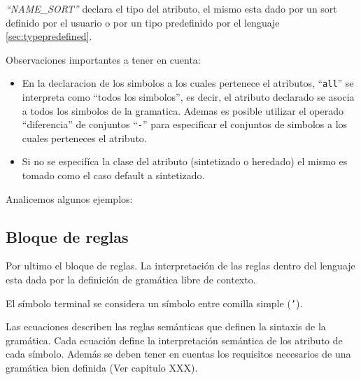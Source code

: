 \textit{``NAME\_SORT''} declara el tipo del atributo, el mismo esta dado por un sort definido por el usuario o por un tipo predefinido por el lenguaje \ref{sec:typepredefined}.


Observaciones importantes a tener en cuenta:
\begin{itemize}
\item En la declaracion de los simbolos a los cuales pertenece el atributos, ``\texttt{all}'' se interpreta como ``todos los simbolos'', es decir, el atributo declarado se asocia a todos los simbolos de la gramatica. Ademas es posible utilizar el operado ``diferencia'' de conjuntos ``\texttt{-}'' para especificar el conjuntos de simbolos a los cuales perteneces el atributo. 
\item Si no se especifíca la clase del atributo (sintetizado o heredado) el mismo es tomado como el caso default a sintetizado.
\end{itemize}

Analicemos algunos ejemplos:\\


\subsection{Bloque de reglas}
Por ultimo el bloque de reglas. La interpretación de las reglas dentro del lenguaje esta dada por la definición de gramática libre de contexto.          

El símbolo terminal se considera un símbolo entre comilla simple (\texttt{'}).\\ 

Las ecuaciones describen las reglas semánticas que definen la sintaxis de la gramática. Cada ecuación define la interpretación semántica de los atributo de cada símbolo. Además se deben tener en cuentas los requisitos necesarios de una gramática bien definida (Ver capitulo XXX).


